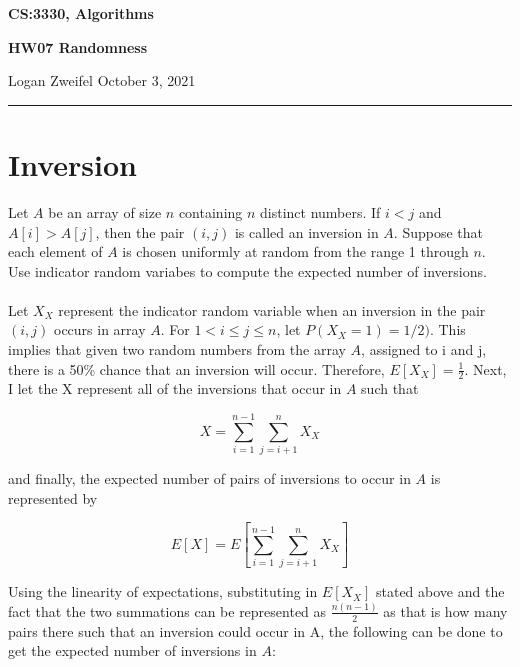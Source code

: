\documentclass[11pt]{article}
\begin{document}
\thispagestyle{empty}

\begin{center}
\bf\large CS:3330, Algorithms
\end{center}

\begin{center}
\bf\large HW07 Randomness  %
\end{center}

\noindent
Logan Zweifel     %
\hfill
October 3, 2021           %

\noindent
\rule{\textwidth}{1pt}

\medskip



\section{Inversion} %
Let $A$ be an array of size $n$ containing $n$ distinct numbers. If $i < j$ and $A[i] > A[j]$, then the pair $(i, j)$ is called an inversion in $A$. Suppose that each element of $A$ is chosen uniformly at random from the range 1 through $n$. Use indicator random variabes to compute the expected number of inversions.\\
\\
Let $X_X$ represent the indicator random variable when an inversion in the pair $(i, j)$ occurs in array $A$. For $1<i \leq j \leq n$, let $P(X_X = 1) = 1/2)$. This implies that given two random numbers from the array $A$, assigned to i and j, there is a 50\% chance that an inversion will occur. Therefore, $E[X_X] = \frac{1}{2}$. Next, I let the X represent all of the inversions that occur in $A$ such that

\begin{equation*}
X = \sum_{i=1}^{n-1} \sum_{j=i+1}^{n} X_X
\end{equation*}

\noindent and finally, the expected number of pairs of inversions to occur in $A$ is represented by 

\begin{equation*}
E[X] = E[\sum_{i=1}^{n-1} \sum_{j=i+1}^{n} X_X]
\end{equation*}

Using the linearity of expectations, substituting in $E[X_X]$ stated above and the fact that the two summations can be represented as $\frac{n(n-1)}{2}$ as that is how many pairs there such that an inversion could occur in A, the following can be done to get the expected number of inversions in $A$:
\end{document}
